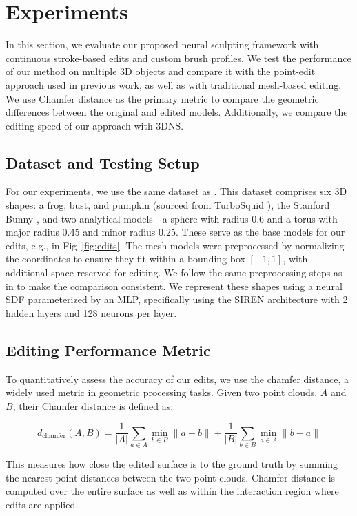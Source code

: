 
\section{Experiments}

In this section, we evaluate our proposed neural sculpting framework with continuous stroke-based edits and custom brush profiles. We test the performance of our method on multiple 3D objects and compare it with the point-edit approach used in previous work, as well as with traditional mesh-based editing. We use Chamfer distance as the primary metric to compare the geometric differences between the original and edited models. Additionally, we compare the editing speed of our approach with 3DNS. 
\subsection{Dataset and Testing Setup}
For our experiments, we use the same dataset as \cite{tzathas20233d}. This dataset comprises six 3D shapes: a frog, bust, and pumpkin (sourced from TurboSquid \cite{turbo}), the Stanford Bunny \cite{turk1994zippered}, and two analytical models—a sphere with radius 0.6 and a torus with major radius 0.45 and minor radius 0.25. These serve as the base models for our edits, e.g., in Fig~\ref{fig:edits}. The mesh models were preprocessed by normalizing the coordinates to ensure they fit within a bounding box $[-1,1]$, with additional space reserved for editing. We follow the same preprocessing steps as in \cite{tzathas20233d} to make the comparison consistent. We represent these shapes using a neural SDF parameterized by an MLP, specifically using the SIREN architecture with 2 hidden layers and 128 neurons per layer.

\subsection{Editing Performance Metric}
To quantitatively assess the accuracy of our edits, we use the chamfer distance, a widely used metric in geometric processing tasks. Given two point clouds, \(A\) and \(B\), their Chamfer distance is defined as:

\begin{equation}
d_{\text{chamfer}}(A, B) = \frac{1}{|A|}\sum_{a \in A} \min_{b \in B} \|a - b\| + \frac{1}{|B|}\sum_{b \in B} \min_{a \in A} \|b - a\|
\end{equation}

This measures how close the edited surface is to the ground truth by summing the nearest point distances between the two point clouds. Chamfer distance is computed over the entire surface as well as within the interaction region where edits are applied.

